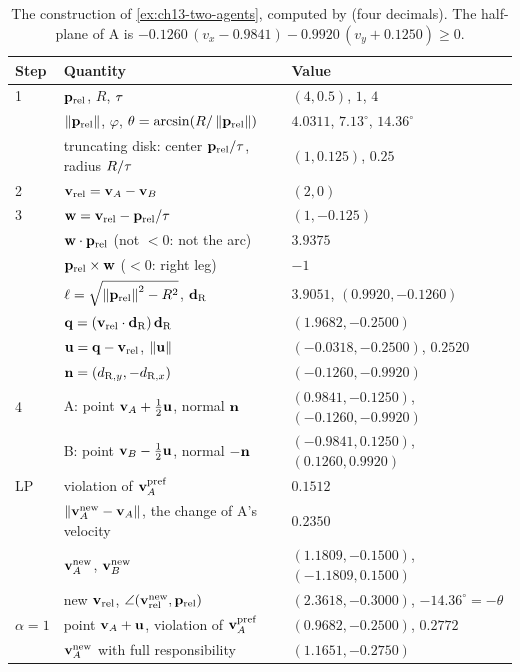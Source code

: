 \begin{table}[tb]
  \centering\small
  \caption{The \orca construction of \cref{ex:ch13-two-agents}, computed by
   (four decimals). The half-plane of A is
  $-0.1260\,(v_x - 0.9841) - 0.9920\,(v_y + 0.1250) \ge 0$.}
  \label{tab:ch13-example}
  \begin{tabular}{@{}lll@{}}
  \toprule
  Step & Quantity & Value\\
  \midrule
  1 & $\mathbf{p}_{\mathrm{rel}}$, $R$, $\tau$ & $(4, 0.5)$, $1$, $4$\\
    & $\left\lVert \mathbf{p}_{\mathrm{rel}} \right\rVert$, $\varphi$, $\theta = \arcsin(R/\left\lVert \mathbf{p}_{\mathrm{rel}} \right\rVert)$ & $4.0311$, $7.13^\circ$, $14.36^\circ$\\
    & truncating disk: center $\mathbf{p}_{\mathrm{rel}}/\tau$, radius $R/\tau$ & $(1, 0.125)$, $0.25$\\
  2 & $\mathbf{v}_{\mathrm{rel}} = \mathbf{v}_A - \mathbf{v}_B$ & $(2, 0)$\\
  3 & $\mathbf{w} = \mathbf{v}_{\mathrm{rel}} - \mathbf{p}_{\mathrm{rel}}/\tau$ & $(1, -0.125)$\\
    & $\mathbf{w}\cdot\mathbf{p}_{\mathrm{rel}}$ (not $< 0$: not the arc) & $3.9375$\\
    & $\mathbf{p}_{\mathrm{rel}} \times \mathbf{w}$ ($< 0$: right leg) & $-1$\\
    & $\ell = \sqrt{\left\lVert \mathbf{p}_{\mathrm{rel}} \right\rVert^2 - R^2}$, $\mathbf{d}_{\mathrm{R}}$ & $3.9051$, $(0.9920, -0.1260)$\\
    & $\mathbf{q} = (\mathbf{v}_{\mathrm{rel}}\cdot\mathbf{d}_{\mathrm{R}})\,\mathbf{d}_{\mathrm{R}}$ & $(1.9682, -0.2500)$\\
    & $\mathbf{u} = \mathbf{q} - \mathbf{v}_{\mathrm{rel}}$, $\left\lVert \mathbf{u} \right\rVert$ & $(-0.0318, -0.2500)$, $0.2520$\\
    & $\mathbf{n} = (d_{\mathrm{R},y}, -d_{\mathrm{R},x})$ & $(-0.1260, -0.9920)$\\
  4 & A: point $\mathbf{v}_A + \tfrac12\mathbf{u}$, normal $\mathbf{n}$ & $(0.9841, -0.1250)$, $(-0.1260, -0.9920)$\\
    & B: point $\mathbf{v}_B - \tfrac12\mathbf{u}$, normal $-\mathbf{n}$ & $(-0.9841, 0.1250)$, $(0.1260, 0.9920)$\\
  LP & violation of $\mathbf{v}_A^{\mathrm{pref}}$ & $0.1512$\\
    & $\left\lVert \mathbf{v}_A^{\mathrm{new}} - \mathbf{v}_A \right\rVert$, the change of A's velocity & $0.2350$\\
    & $\mathbf{v}_A^{\mathrm{new}}$, $\mathbf{v}_B^{\mathrm{new}}$ & $(1.1809, -0.1500)$, $(-1.1809, 0.1500)$\\
    & new $\mathbf{v}_{\mathrm{rel}}$, $\angle(\mathbf{v}_{\mathrm{rel}}^{\mathrm{new}}, \mathbf{p}_{\mathrm{rel}})$ & $(2.3618, -0.3000)$, $-14.36^\circ = -\theta$\\
  $\alpha = 1$ & point $\mathbf{v}_A + \mathbf{u}$, violation of $\mathbf{v}_A^{\mathrm{pref}}$ & $(0.9682, -0.2500)$, $0.2772$\\
    & $\mathbf{v}_A^{\mathrm{new}}$ with full responsibility & $(1.1651, -0.2750)$\\
  \bottomrule
  \end{tabular}
\end{table}


